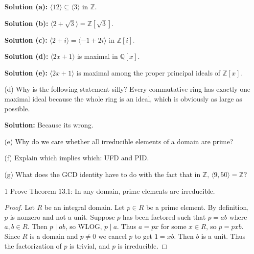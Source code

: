\textbf{Solution (a):} $\langle 12 \rangle \subseteq \langle 3 \rangle$ in $\mathbb{Z}$.

\textbf{Solution (b):} $\langle 2 + \sqrt{3} \rangle = \mathbb{Z}[\sqrt{3}]$.

\textbf{Solution (c):} $\langle 2 + i \rangle = \langle -1 + 2i \rangle$ in $\mathbb{Z}[i]$.

\textbf{Solution (d):} $\langle 2x + 1 \rangle$ is maximal in $\mathbb{Q}[x]$.

\textbf{Solution (e):} $\langle 2x + 1 \rangle$ is maximal among the
proper principal ideals of $\mathbb{Z}[x]$.

\begin{problem}[Warmup]{(d)}
    Why is the following statement silly?
    Every commutative ring has exactly one maximal ideal because the whole ring is an ideal,
        which is obviously as large as possible.
\end{problem}
\solved

\textbf{Solution: } Because its wrong.

\begin{problem}[Warmup]{(e)}
    Why do we care whether all irreducible elements of a domain are prime?
\end{problem}
\unsolved

\begin{problem}[Warmup]{(f)}
    Explain which implies which: UFD and PID.
\end{problem}
\unsolved

\begin{problem}[Warmup]{(g)}
    What does the GCD identity have to do with the fact that in $\mathbb{Z}$, $\langle 9, 50 \rangle = \mathbb{Z}$?
\end{problem}
\unsolved

\begin{problem}{1}
    Prove Theorem 13.1: In any domain, prime elements are irreducible.
\end{problem}
\solved

\begin{proof}
    Let $R$ be an integral domain.
    Let $p \in R$ be a prime element.
    By definition, $p$ is nonzero and not a unit.
    Suppose $p$ has been factored such that $p = ab$ where $a, b \in R$.
    Then $p \mid ab$, so WLOG, $p \mid a$.
    Thus $a = px$ for some $x \in R$, so $p = pxb$.
    Since $R$ is a domain and $p \ne 0$ we cancel $p$
        to get $1 = xb$.
    Then $b$ is a unit.
    Thus the factorization of $p$ is trivial,
        and $p$ is irreducible.
\end{proof}

